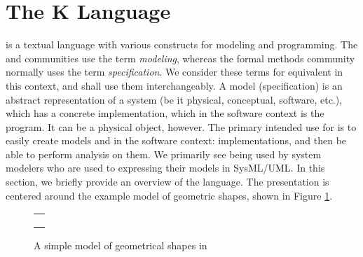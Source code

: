 \section{The K Language}
\label{sec:k}

\Klang{} is a textual language with various constructs for modeling
and programming. The \uml{} and \sysml{} communities use the term {\em
  modeling}, whereas the formal methods community normally uses the
term {\em specification}. We consider these terms for equivalent in
this context, and shall use them interchangeably. A model
(specification) is an abstract representation of a system (be it
physical, conceptual, software, etc.), which has a concrete
implementation, which in the software context is the program. It can
be a physical object, however. The primary intended use for \Klang{}
is to easily create models and in the software context:
implementations, and then be able to perform analysis on them. We
primarily see \Klang{} being used by system modelers who are used to
expressing their models in SysML/UML. In this section, we briefly
provide an overview of the \Klang{} language. The presentation is
centered around the example \Klang{} model of geometric shapes, shown
in Figure \ref{fig:shapes}.

\begin{figure}[htb]
\centering
\begin{tabular}{c}
\hline \\
 \\ \\
\hline
\end{tabular}
\caption{A simple model of geometrical shapes in \Klang{}}
\label{fig:shapes}
\end{figure}

